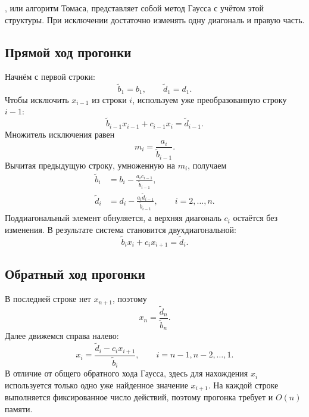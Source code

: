 \documentclass[../final.tex]{subfiles}
\begin{document}
, или алгоритм Томаса, представляет собой
метод Гаусса с учётом этой структуры. При исключении достаточно
изменять одну диагональ и правую часть.

\subsection{Прямой ход прогонки}

Начнём с первой строки:
\begin{equation*}
    \widetilde b_1=b_1,\qquad \widetilde d_1=d_1.
\end{equation*}
Чтобы исключить $x_{i-1}$ из строки $i$, используем уже
преобразованную строку $i-1$:
\begin{equation*}
    \widetilde b_{i-1}x_{i-1}+c_{i-1}x_i=\widetilde d_{i-1}.
\end{equation*}
Множитель исключения равен
\begin{equation*}
    m_i=\frac{a_i}{\widetilde b_{i-1}}.
\end{equation*}
Вычитая предыдущую строку, умноженную на $m_i$, получаем
\begin{align*}
    \widetilde b_i&=b_i-\frac{a_i c_{i-1}}{\widetilde b_{i-1}},\\
    \widetilde d_i&=d_i-\frac{a_i\widetilde d_{i-1}}
        {\widetilde b_{i-1}},\qquad i=2,\ldots,n.
\end{align*}
Поддиагональный элемент обнуляется, а верхняя диагональ
$c_i$ остаётся без изменения. В результате система становится
двухдиагональной:
\begin{equation*}
    \widetilde b_i x_i+c_i x_{i+1}=\widetilde d_i.
\end{equation*}

\subsection{Обратный ход прогонки}

В последней строке нет $x_{n+1}$, поэтому
\begin{equation*}
    x_n=\frac{\widetilde d_n}{\widetilde b_n}.
\end{equation*}
Далее движемся справа налево:
\begin{equation*}
    x_i=\frac{\widetilde d_i-c_i x_{i+1}}{\widetilde b_i},
    \qquad i=n-1,n-2,\ldots,1.
\end{equation*}
В отличие от общего обратного хода Гаусса, здесь для нахождения
$x_i$ используется только одно уже найденное значение $x_{i+1}$.
На каждой строке выполняется фиксированное число действий,
поэтому прогонка требует  и $O(n)$ памяти.
\end{document}
